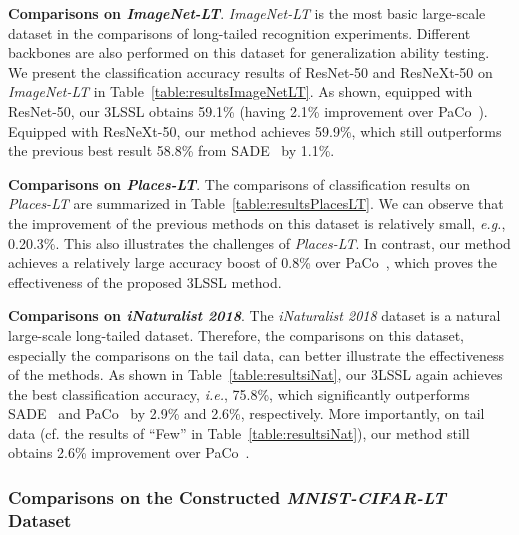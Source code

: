 \documentclass[10pt,journal,compsoc]{IEEEtran}
\newcommand{\eg}{\emph{e.g.}}
\newcommand{\ie}{\emph{i.e.}}
\begin{document}
\textbf{Comparisons on \emph{ImageNet-LT}}. \emph{ImageNet-LT} is the most basic large-scale dataset in the comparisons of long-tailed recognition experiments. Different backbones are also performed on this dataset for generalization ability testing. We present the classification accuracy results of ResNet-50 and ResNeXt-50 on \emph{ImageNet-LT} in Table~\ref{table:resultsImageNetLT}. As shown, equipped with ResNet-50, our 3LSSL obtains 59.1\% (having 2.1\% improvement over PaCo~\cite{Cui_2021_ICCV}). Equipped with ResNeXt-50, our method achieves 59.9\%, which still outperforms the previous best result 58.8\% from SADE~\cite{SADEnips22} by 1.1\%.

\textbf{Comparisons on \emph{Places-LT}}. The comparisons of classification results on \emph{Places-LT} are summarized in Table~\ref{table:resultsPlacesLT}. We can observe that the improvement of the previous methods on this dataset is relatively small, \eg, 0.20.3\%. This also illustrates the challenges of \emph{Places-LT}. In contrast, our method achieves a relatively large accuracy boost of 0.8\% over PaCo~\cite{Cui_2021_ICCV}, which proves the effectiveness of the proposed 3LSSL method.

\textbf{Comparisons on \emph{iNaturalist 2018}}. The \emph{iNaturalist 2018} dataset is a natural large-scale long-tailed dataset. Therefore, the comparisons on this dataset, especially the comparisons on the tail data, can better illustrate the effectiveness of the methods. As shown in Table~\ref{table:resultsiNat}, our 3LSSL again achieves the best classification accuracy, \ie, 75.8\%, which significantly outperforms SADE~\cite{SADEnips22} and PaCo~\cite{Cui_2021_ICCV} by 2.9\% and 2.6\%, respectively. More importantly, on tail data (cf. the results of ``\textsf{Few}'' in Table~\ref{table:resultsiNat}), our method still obtains 2.6\% improvement over PaCo~\cite{Cui_2021_ICCV}.

\subsubsection{Comparisons on the Constructed \emph{MNIST-CIFAR-LT} Dataset}
\end{document}
